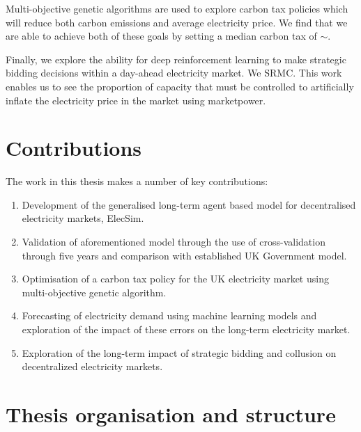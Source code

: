 Multi-objective genetic algorithms are used to explore carbon tax policies which will reduce both carbon emissions and average electricity price. We find that we are able to achieve both of these goals by setting a median carbon tax of ${\sim}$.

Finally, we explore the ability for deep reinforcement learning to make strategic bidding decisions within a day-ahead electricity market. We \gls{SRMC}. This work enables us to see the proportion of capacity that must be controlled to artificially inflate the electricity price in the market using \gls{marketpower}. 

\section{Contributions}

The work in this thesis makes a number of key contributions:

\begin{enumerate}
	\item Development of the generalised long-term agent based model for decentralised electricity markets, ElecSim.
	\item Validation of aforementioned model through the use of cross-validation through five years and comparison with established UK Government model.
	\item Optimisation of a carbon tax policy for the UK electricity market using multi-objective genetic algorithm.
	\item Forecasting of electricity demand using machine learning models and exploration of the impact of these errors on the long-term electricity market.
	\item Exploration of the long-term impact of strategic bidding and collusion on decentralized electricity markets.
\end{enumerate}

\section{Thesis organisation and structure}


